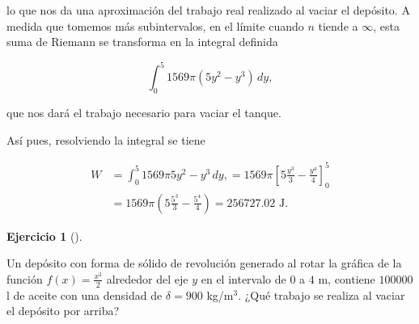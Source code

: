\documentclass[
  a4paper,
]{scrreport}
\theoremstyle{definition}
\newtheorem{exercise}{Ejercicio}[chapter]
\theoremstyle{remark}
\begin{document}
\begin{tcolorbox}
lo que nos da una aproximación del trabajo real realizado al vaciar el
depósito. A medida que tomemos más subintervalos, en el límite cuando
\(n\) tiende a \(\infty\), esta suma de Riemann se transforma en la
integral definida

\[
\int_0^5 1569 \pi (5y^2-y^3)\,dy,
\]

que nos dará el trabajo necesario para vaciar el tanque.

Así pues, resolviendo la integral se tiene

\begin{align*}
W 
&= \int_0^5 1569 \pi 5y^2-y^3\,dy,
= 1569\pi \left[5\frac{y^3}{3}-\frac{y^4}{4}\right]_0^5 \\
&= 1569\pi\left(5\frac{5^3}{3}-\frac{5^4}{4}\right)
= 256727.02 \mbox{ J.}
\end{align*}

\end{tcolorbox}

\begin{exercise}[]\protect\hypertarget{exr-trabajo-deposito-2}{}\label{exr-trabajo-deposito-2}

Un depósito con forma de sólido de revolución generado al rotar la
gráfica de la función \(f(x)=\frac{x^2}{2}\) alrededor del eje \(y\) en
el intervalo de \(0\) a \(4\) m, contiene \(100000\) l de aceite con una
densidad de \(\delta = 900\) kg/m\(^3\). ¿Qué trabajo se realiza al
vaciar el depósito por arriba?

\end{exercise}
\end{document}
